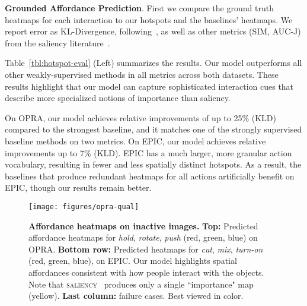 \documentclass[10pt,twocolumn,letterpaper]{article}
\newcommand{\SC}[1]{{\textsc{#1}}}
\newcommand{\reftbl}[1]{Table~\ref{#1}}
\begin{document}
\vspace{0.05in}
\noindent\textbf{Grounded Affordance Prediction}. First we compare the ground truth heatmaps for each interaction to our hotspots and the baselines' heatmaps.  We report error as KL-Divergence, following~\cite{fang2018demo2vec}, as well as other metrics (SIM, AUC-J) from the saliency literature~\cite{bylinskii2018different}.











\reftbl{tbl:hotspot-eval} (Left) summarizes the results.  Our model outperforms all other weakly-supervised methods in all metrics across both datasets. These results highlight that our model can capture sophisticated interaction cues that describe more specialized notions of importance than saliency. 

On OPRA, our model achieves relative improvements of up to 25\% (KLD) compared to the strongest baseline, and it matches one of the strongly supervised baseline methods on two metrics.
On EPIC, our model achieves relative improvements up to 7\% (KLD). EPIC has a much larger, more granular action vocabulary, resulting in fewer and less spatially distinct hotspots. As a result, the baselines that produce redundant heatmaps for all actions artificially benefit on EPIC, though our results remain better. 



\begin{figure}[t!]
\centering
\texttt{[image: figures/opra-qual]}
\vspace*{-0.2in}\caption{\textbf{Affordance heatmaps on inactive images.} \textbf{Top:} Predicted affordance heatmaps for \emph{hold}, \emph{rotate}, \emph{push} (red, green, blue) on OPRA. \textbf{Bottom row:} Predicted heatmaps for \emph{cut}, \emph{mix}, \emph{turn-on} (red, green, blue), on EPIC. Our model highlights spatial affordances consistent with how people interact with the objects. Note that \SC{saliency}~\cite{pan2017salgan} produces only a single ``importance" map (yellow).  \textbf{Last column:} failure cases. Best viewed in color.  
} \vspace*{-0.1in}
\label{fig:opra-qual}
\end{figure}
\end{document}
